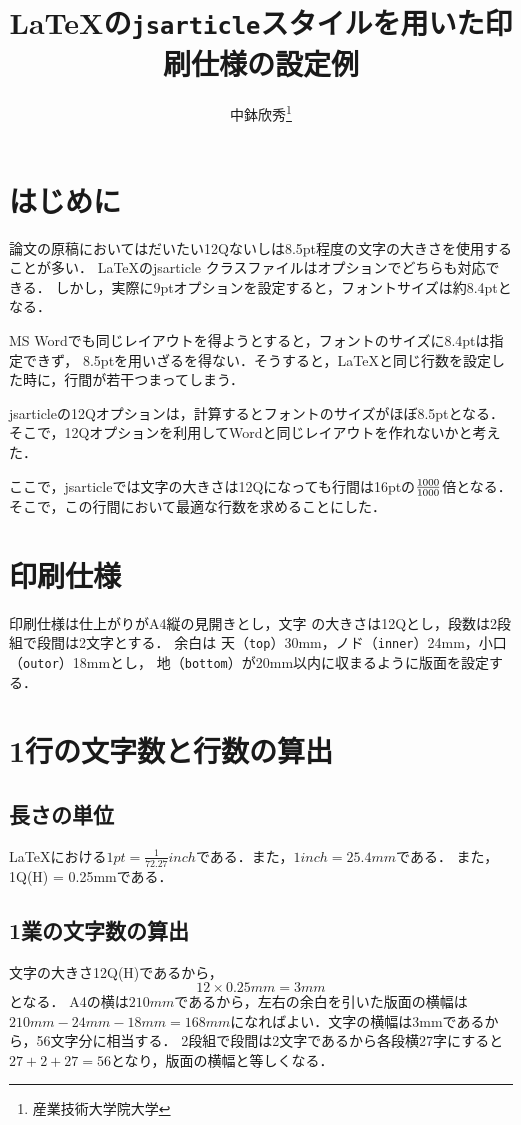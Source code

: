 \documentclass[a4j, 12Q, twocolumn, twoside]{jsarticle}
\title{\LaTeX の\texttt{jsarticle}スタイルを用いた印刷仕様の設定例}
\author{中鉢欣秀\thanks{産業技術大学院大学}}
\begin{document}
\maketitle
\section{はじめに}
  論文の原稿においてはだいたい12Qないしは8.5pt程度の文字の大きさを使用することが多い．
  \LaTeX のjsarticle クラスファイルはオプションでどちらも対応できる．
  しかし，実際に9ptオプションを設定すると，フォントサイズは約8.4ptとなる．
  
  MS Wordでも同じレイアウトを得ようとすると，フォントのサイズに8.4ptは指定できず，
  8.5ptを用いざるを得ない．そうすると，\LaTeX と同じ行数を設定した時に，行間が若干つまってしまう．
  
  jsarticleの12Qオプションは，計算するとフォントのサイズがほぼ8.5ptとなる．
  そこで，12Qオプションを利用してWordと同じレイアウトを作れないかと考えた．
  
  ここで，jsarticleでは文字の大きさは12Qになっても行間は16ptの$\frac{\the\mag}{1000}$倍となる．
  そこで，この行間において最適な行数を求めることにした．
\section{印刷仕様}

  印刷仕様は仕上がりがA4縦の見開きとし，文字
  の大きさは12Qとし，段数は2段組で段間は2文字とする．
  余白は
  天（\texttt{top}）30mm，ノド（\texttt{inner}）24mm，小口（\texttt{outor}）18mmとし，
  地（\texttt{bottom}）が20mm以内に収まるように版面を設定する．

\section{1行の文字数と行数の算出}
  \subsection{長さの単位}
  \LaTeX における$1 pt = \frac{1}{72.27} inch$である．また，$1 inch = 25.4 mm$である．
  また，1Q(H) = 0.25mmである．
  
  \subsection{1業の文字数の算出}
  文字の大きさ12Q(H)であるから，
  \[ 12 \times 0.25 mm = 3 mm \]
  となる．  
  A4の横は$210mm$であるから，左右の余白を引いた版面の横幅は
  $210mm - 24mm - 18mm = 168mm$になればよい．文字の横幅は3mmであるから，56文字分に相当する．
  2段組で段間は2文字であるから各段横27字にすると$ 27 + 2 + 27 = 56 $となり，版面の横幅と等しくなる．
\end{document}
